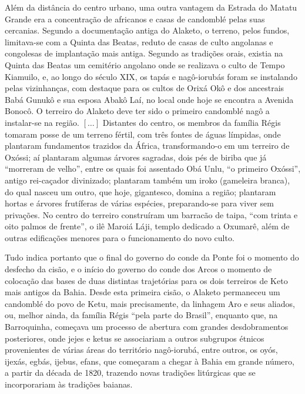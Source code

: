 \begin{citacao}
Além da distância do centro urbano, uma outra vantagem da Estrada do Matatu Grande era a concentração de africanos e casas de candomblé pelas suas cercanias. Segundo a documentação antiga do Alaketo, o terreno, pelos fundos, limitava-se com a Quinta das Beatas, reduto de casas de culto angolanas e congolesas de implantação mais antiga. Segundo as tradições orais, existia na Quinta das Beatas um cemitério angolano onde se realizava o culto de Tempo Kiamuilo, e, ao longo do século XIX, os tapás e nagô-iorubás foram se instalando pelas vizinhanças, com destaque para os cultos de Orixá Okô e dos ancestrais Babá Gunukô e sua esposa Abakô Laí, no local onde hoje se encontra a Avenida Bonocô. O terreiro do Alaketo deve ter sido o primeiro candomblé nagô a instalar-se na região. \([\dots]\) Distantes do centro, os membros da família Régis tomaram posse de um terreno fértil, com três fontes de águas límpidas, onde plantaram fundamentos trazidos da África, transformando-o em um terreiro de Oxóssi; aí plantaram algumas árvores sagradas, dois pés de biriba que já “morreram de velho”, entre os quais foi assentado Obá Unlu, “o primeiro Oxóssi”, antigo rei-caçador divinizado; plantaram também um iroko (gameleira branca), do qual nasceu um outro, que hoje, gigantesco, domina a região; plantaram hortas e árvores frutíferas de várias espécies, preparando-se para viver sem privações. No centro do terreiro construíram um barracão de taipa, ``com trinta e oito palmos de frente'', o ilê Maroiá Láji, templo dedicado a Oxumarê, além de outras edificações menores para o funcionamento do novo culto.

Tudo indica portanto que o final do governo do conde da Ponte foi o momento do desfecho da cisão, e o início do governo do conde dos Arcos o momento de colocação das bases de duas distintas trajetórias para os dois terreiros de Keto mais antigos da Bahia. Desde esta primeira cisão, o Alaketo permaneceu um candomblé do povo de Ketu, mais precisamente, da linhagem Aro e seus aliados, ou, melhor ainda, da família Régis “pela parte do Brasil”, enquanto que, na Barroquinha, começava um processo de abertura com grandes desdobramentos posteriores, onde jejes e ketus se associariam a outros subgrupos étnicos provenientes de várias áreas do território nagô-iorubá, entre outros, os oyós, ijexás, egbás, ijebus, efans, que começaram a chegar à Bahia em grande número, a partir da década de 1820, trazendo novas tradições litúrgicas que se incorporariam às tradições baianas.


\end{citacao}
